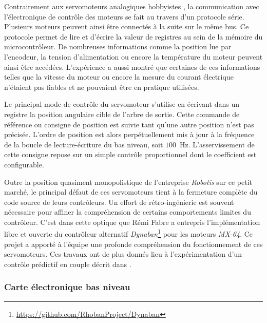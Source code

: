 Contrairement aux servomoteurs analogiques \og hobbyistes \fg,
la communication avec l'électronique de contrôle des moteurs 
se fait au travers d'un protocole série. 
Plusieurs moteurs peuvent ainsi être connectés à la suite sur le même bus.
Ce protocole permet de lire et d'écrire la valeur de registres au sein de
la mémoire du microcontrôleur.
De nombreuses informations comme la position lue par l'encodeur, 
la tension d'alimentation ou encore la température du moteur peuvent 
ainsi être accédées. 
L'expérience a aussi montré que certaines de ces informations 
telles que la vitesse du moteur ou encore la mesure du courant électrique
n'étaient pas fiables et ne pouvaient être en pratique utilisées.

Le principal mode de contrôle du servomoteur s'utilise en écrivant 
dans un registre la position angulaire cible de l'arbre de sortie.
Cette commande de référence ou consigne de position est suivie
tant qu'une autre position n'est pas précisée.
L'ordre de position est alors perpétuellement mis à jour à la fréquence
de la boucle de lecture-écriture du bas niveau, soit $100$~Hz.
L'asservissement de cette consigne repose sur un simple contrôle
proportionnel dont le coefficient est configurable.

Outre la position quasiment monopolistique de l'entreprise \textit{Robotis}
sur ce petit marché, le principal défaut de ces servomoteurs 
tient à la fermeture complète du code source de leurs contrôleurs.
Un effort de rétro-ingénierie est souvent nécessaire pour affiner
la compréhension de certains comportements limites du contrôleur.
C'est dans cette optique que Rémi Fabre a entrepris l'implémentation libre et ouverte
du contrôleur alternatif 
\textit{Dynaban}\footnote{\url{https://github.com/RhobanProject/Dynaban}} 
pour les moteurs \textit{MX-64}.
Ce projet a apporté à l'équipe une profonde compréhension 
du fonctionnement de ces servomoteurs.
Ces travaux ont de plus donnés lieu à l'expérimentation d'un contrôle 
prédictif en couple décrit dans \cite{DynabanRoboCup2016}.

\subsubsection{Carte électronique bas niveau}


